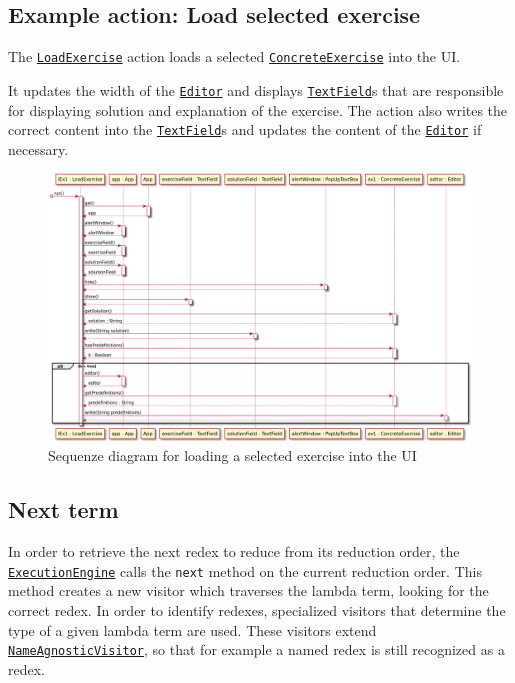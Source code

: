 \subsection{Example action: Load selected exercise}
The \texttt{\hyperref[type:edu.kit.wavelength.client.view.action.LoadExercise]{LoadExercise}} 
action loads a selected \texttt{\hyperref[type:edu.kit.wavelength.client.view.exercise.ConcreteExercise]{ConcreteExercise}} into the UI.

It updates the width of the \texttt{\hyperref[type:edu.kit.wavelength.client.view.webui.component.Editor]{Editor}} and displays \texttt{\hyperref[type:edu.kit.wavelength.client.view.webui.component.TextField]{TextField}}s 
that are responsible for displaying solution and explanation of the exercise.
The action also writes the correct content into the \texttt{\hyperref[type:edu.kit.wavelength.client.view.webui.component.TextField]{TextField}}s and updates the content of the \texttt{\hyperref[type:edu.kit.wavelength.client.view.webui.component.Editor]{Editor}} if necessary.

\begin{figure}[H]
	\centering
	\includegraphics[width=\textwidth]{sequenceDiagrams/loadExercise}
	\caption{Sequenze diagram for loading a selected exercise into the UI}
\end{figure}

\subsection{Next term}
\label{sec:nt}
In order to retrieve the next redex to reduce from its reduction order, the
\texttt{\hyperref[type:edu.kit.wavelength.client.model.ExecutionEngine]{ExecutionEngine}}
calls the \texttt{next} method on the current reduction order. This method creates a new visitor which traverses
the lambda term, looking for the correct redex. In order to identify redexes,
specialized visitors that determine the type of a given lambda term are used.
These visitors extend \texttt{\hyperref[type:edu.kit.wavelength.client.model.term.NameAgnosticVisitor]{NameAgnosticVisitor}},
so that for example a named redex is still recognized as a redex.



